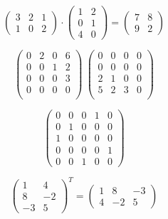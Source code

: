 \begin{example}
   \[\begin{pmatrix} 3 & 2 & 1 \\ 1 & 0 & 2 \end{pmatrix} \cdot \begin{pmatrix} 1 & 2 \\ 0 & 1 \\ 4 & 0 \end{pmatrix} = \begin{pmatrix} 7 & 8 \\ 9 & 2 \end{pmatrix}\]
\end{example}

\begin{example}
   \[\begin{pmatrix}
         0 & 2 & 0 & 6 \\
         0 & 0 & 1 & 2 \\
         0 & 0 & 0 & 3 \\
         0 & 0 & 0 & 0 \\
   \end{pmatrix}~\begin{pmatrix}
         0 & 0 & 0 & 0 \\
         0 & 0 & 0 & 0 \\
         2 & 1 & 0 & 0 \\
         5 & 2 & 3 & 0 \\
   \end{pmatrix}\]
\end{example}

\begin{example}[Permutationmatrix]
   \[\begin{pmatrix}
         0 & 0 & 0 & 1 & 0 \\
         0 & 1 & 0 & 0 & 0 \\
         1 & 0 & 0 & 0 & 0 \\
         0 & 0 & 0 & 0 & 1 \\
         0 & 0 & 1 & 0 & 0
   \end{pmatrix}\]
\end{example}

\begin{example}
   \[\begin{pmatrix} 1 & 4 \\ 8 & -2 \\ -3 & 5\end{pmatrix}^T = \begin{pmatrix} 1 & 8 & -3 \\ 4 & -2 & 5 \end{pmatrix}\]
\end{example}


